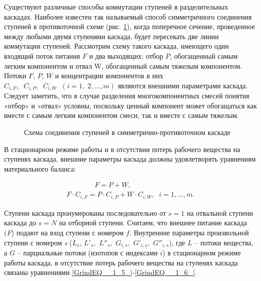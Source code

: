 Существуют различные способы коммутации ступеней в разделительных каскадах. Наиболее известен так называемый способ симметричного соединения ступеней в противоточной схеме (рис. \ref{1_2}), когда поперечное сечение, проведенное между любыми двумя ступенями каскада, будет пересекать две линии коммутации ступеней. Рассмотрим схему такого каскада, имеющего один входящий поток питания $F$ и два выходящих: отбор $P$, обогащенный самым легким компонентом и отвал W, обогащенный самым тяжелым компонентом. Потоки $F$, $P$, $W$ и концентрации компонентов в них $C_{i,F} ,\; \; C_{i,P} ,\; \; C_{i,W} \; \; (i=1,\; 2,...,m)$ являются внешними параметрами каскада. Следует заметить, что в случае разделения многокомпонентных смесей понятия «отбор» и «отвал» условны, поскольку ценный компонент может обогащаться как вместе с самым легким компонентом смеси, так и вместе с самым тяжелым.

\begin{figure}[ht]
  \caption{Схема соединения ступеней в симметрично-противоточном каскаде}\label{1_2}
\end{figure}

В стационарном режиме работы и в отсутствии потерь рабочего вещества на ступенях каскада, внешние параметры каскада должны удовлетворять уравнениям материального баланса:

\begin{equation} \label{GrindEQ__1_21_} 
  \begin{array}{l} {\quad \quad \quad \quad F=P+W,} \\ {F \cdot C_{i,F} =P \cdot C_{i,P} +W \cdot C_{i,W} ,\; \; i=1,...,m.} \end{array} 
\end{equation} 

Ступени каскада пронумерованы последовательно от $s=1$ на отвальной ступени каскада до $s=N$ на отборной ступени. Считаем, что внешнее питание каскада (\textit{F}) подают на вход ступени с номером $f$. Внутренние параметры произвольной ступени с номером \textit{s} ($L_{s} $, $L'_{s} ,$ $L''_{s} ,$ $G_{i,s} ,$ $G'_{i,s} ,$ $G''_{i,s} $), где $L$ -- потоки вещества, а $G$ -- парциальные потоки (изотопов с индексами $i$) в стационарном режиме работы каскада, в отсутствие потерь рабочего вещества на ступенях каскада связаны уравнениями \ref{GrindEQ__1_5_}-\ref{GrindEQ__1_6_}.

